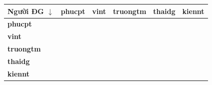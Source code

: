 \documentclass[12pt,a4paper]{article}
\begin{document}
\begin{table}[H]
\centering
\renewcommand{\arraystretch}{1.15}
\begin{tabularx}{\textwidth}{|>{\centering\arraybackslash}X|>{\centering\arraybackslash}X|>{\centering\arraybackslash}X|>{\centering\arraybackslash}X|>{\centering\arraybackslash}X|>{\centering\arraybackslash}X|}
\hline
\rowcolor{gray!15} \textbf{Người ĐG $\downarrow$} & \textbf{phucpt} & \textbf{vint} & \textbf{truongtm} & \textbf{thaidg} & \textbf{kiennt} \\ \hline
\textbf{phucpt} &  &  &  &  &  \\ \hline
\textbf{vint} &  &  &  &  &  \\ \hline
\textbf{truongtm} &  &  &  &  &  \\ \hline
\textbf{thaidg} &  &  &  &  &  \\ \hline
\textbf{kiennt} &  &  &  &  &  \\ \hline
\end{tabularx}
\end{table}
\label{LastPageTeamContractValidation}
\end{document}
